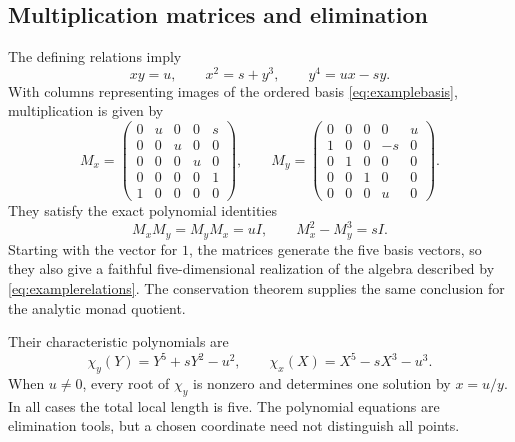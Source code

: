 \documentclass[11pt]{article}
\theoremstyle{definition}
\begin{document}
\subsection{Multiplication matrices and elimination}
The defining relations imply
\begin{equation}\label{eq:examplerelations}
 xy=u,\qquad x^2=s+y^3,\qquad y^4=ux-sy.
\end{equation}
With columns representing images of the ordered basis \eqref{eq:examplebasis}, multiplication is given by
\begin{equation}\label{eq:examplematrices}
 M_x=\begin{pmatrix}
 0&u&0&0&s\\
 0&0&u&0&0\\
 0&0&0&u&0\\
 0&0&0&0&1\\
 1&0&0&0&0
 \end{pmatrix},\qquad
 M_y=\begin{pmatrix}
 0&0&0&0&u\\
 1&0&0&-s&0\\
 0&1&0&0&0\\
 0&0&1&0&0\\
 0&0&0&u&0
 \end{pmatrix}.
\end{equation}
They satisfy the exact polynomial identities
\begin{equation}\label{eq:matrixidentities}
 M_xM_y=M_yM_x=uI,
 \qquad M_x^2-M_y^3=sI.
\end{equation}
Starting with the vector for $1$, the matrices generate the five basis vectors, so they also give a faithful five-dimensional realization of the algebra described by \eqref{eq:examplerelations}. The conservation theorem supplies the same conclusion for the analytic monad quotient.

Their characteristic polynomials are
\begin{equation}\label{eq:characteristicexample}
 \chi_y(Y)=Y^5+sY^2-u^2,\qquad
 \chi_x(X)=X^5-sX^3-u^3.
\end{equation}
When $u\ne0$, every root of $\chi_y$ is nonzero and determines one solution by $x=u/y$. In all cases the total local length is five. The polynomial equations are elimination tools, but a chosen coordinate need not distinguish all points.
\end{document}
